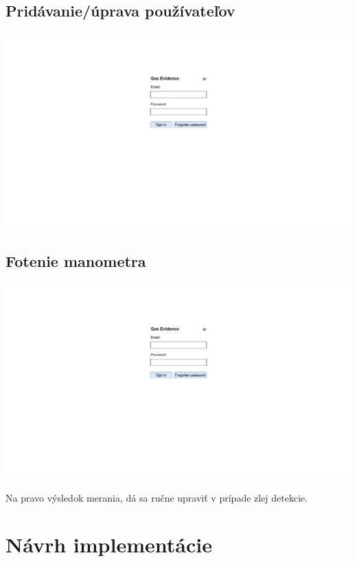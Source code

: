 \documentclass{zah}
\begin{document}
\subsection{Pridávanie/úprava používateľov}
\begin{center}
\includegraphics[width=.7\textwidth,page=10]{navrh-assets/ui}
\end{center}

\subsection{Fotenie manometra}
\begin{center}
\includegraphics[width=.7\textwidth,page=11]{navrh-assets/ui}
\end{center}
Na pravo výsledok merania, dá sa ručne upraviť v prípade zlej detekcie.

\section{Návrh implementácie}
\end{document}
